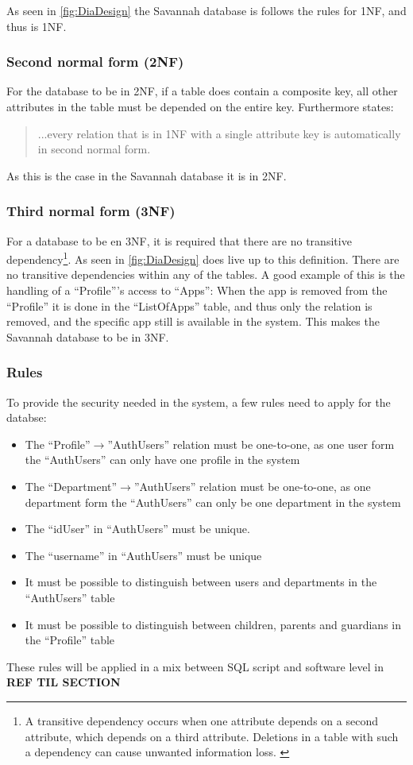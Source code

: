 As seen in \autoref{fig:DiaDesign} the Savannah database is follows the rules for 1NF, and thus is 1NF.

\subsubsection{Second normal form (2NF)}
For the database to be in 2NF, if a table does contain a composite key, all other attributes in the table must be depended on the entire key.
Furthermore \cite[p. 117]{sqlForDummies} states:
\begin{quotation}
...every
relation that is in 1NF with a single attribute key is automatically in second
normal form.
\end{quotation}
As this is the case in the Savannah database it is in 2NF.

\subsubsection{Third normal form (3NF)}
For a database to be en 3NF, it is required that there are no transitive dependency\footnote{A transitive dependency occurs when one attribute depends on a second
attribute, which depends on a third attribute. Deletions in a table with such a
dependency can cause unwanted information loss. \cite[p. 118]{sqlForDummies}}.
As seen in \autoref{fig:DiaDesign} does live up to this definition. There are no transitive dependencies within any of the tables. A good example of this is the handling of a ``Profile'''s access to ``Apps'': When the app is removed from the ``Profile'' it is done in the ``ListOfApps'' table, and thus only the relation is removed, and the specific app still is available in the system. This makes the Savannah database to be in 3NF.



\subsubsection*{Rules}
\label{databaseRules}
To provide the security needed in the system, a few rules need to apply for the databse:
\begin{itemize}
	\item The ``Profile''$\rightarrow$''AuthUsers'' relation must be one-to-one, as one user form the ``AuthUsers'' can only have one profile in the system
	\item The ``Department''$\rightarrow$''AuthUsers'' relation must be one-to-one, as one department form the ``AuthUsers'' can only be one department in the system
	\item The ``idUser'' in ``AuthUsers'' must be unique.
	\item The ``username'' in ``AuthUsers'' must be unique
	\item It must be possible to distinguish between users and departments in the ``AuthUsers'' table
	\item It must be possible to distinguish between children, parents and guardians in the ``Profile'' table
\end{itemize}

These rules will be applied in a mix between SQL script and software level in \textbf{REF TIL SECTION}